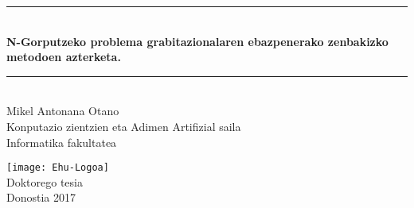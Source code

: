 \begin{titlepage}
\newcommand{\HRule}{\rule{\linewidth}{0.5mm}}
\begin{center}
\HRule \\[0.4cm]
{ \Large \bfseries \sc N-Gorputzeko problema grabitazionalaren ebazpenerako zenbakizko metodoen azterketa.}\\[0.4cm]

\HRule \\[1cm]
{\Large Mikel Antonana Otano}
\\[.75cm]


{\large Konputazio zientzien eta Adimen Artifizial saila \\[.1cm]
}
{\large Informatika fakultatea \\[2.cm]
}


\texttt{[image: Ehu-Logoa]}
\\[5cm]

{\large Doktorego tesia\\[.1cm]}
{\large Donostia 2017}




\end{center}
\end{titlepage}\pagebreak